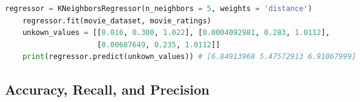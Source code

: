 \documentclass[11pt, a4paper]{article}
\begin{document}
\begin{spacing}{1.1}
\begin{lstlisting}[language=Python]
	regressor = KNeighborsRegressor(n_neighbors = 5, weights = 'distance')
	regressor.fit(movie_dataset, movie_ratings)
	unkown_values = [[0.016, 0.300, 1.022], [0.0004092981, 0.283, 1.0112], 
	                 [0.00687649, 0.235, 1.0112]]
	print(regressor.predict(unkown_values)) # [6.84913968 5.47572913 6.91067999] \end{lstlisting}\vspace*{1mm}
	
	\subsection{Accuracy, Recall, and Precision}
	
	
	
	
	
	
	
	
	
	
\end{spacing}
\end{document}
